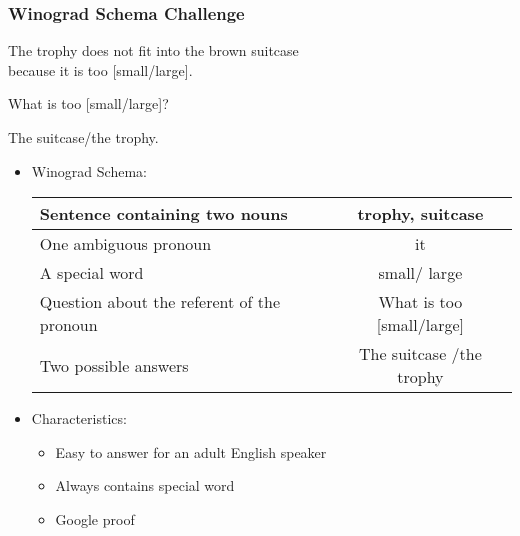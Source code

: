 \documentclass[c,8pt,xcolor...,x11names]{beamer}
\begin{document}
\begin{frame}
\frametitle{Winograd Schema Challenge}
	\begin{itemize}
	\small{
	\item[S:] The trophy does not fit into the brown suitcase\\ because \alert{it} is too \alert{[small/large]}.
	\item[Q:] What is too [small/large]?
	\item[A:] The suitcase/the trophy. }
\end{itemize} 
\begin{itemize}
	\item Winograd Schema: 
	\begin{center}
	\begin{tabular}{ l | c }
		Sentence containing two nouns &  \alert{trophy}, \alert{suitcase} \\
		\hline 
		One ambiguous pronoun & \alert{it} \\  
		\hline
		A special word & \alert{small}/\alert{ large}\\
		\hline
		Question about the referent of the pronoun & What is too [\alert{small}/\alert{large}]\\
		\hline
		Two possible answers & \alert{The suitcase} /\alert{the trophy}\\
	\end{tabular}
	\end{center}


		 \item Characteristics:
		  \begin{itemize}
		\normalsize
		\item Easy to answer for an adult English speaker
		\item Always contains \alert{special word}
		\item Google proof
	\end{itemize}
\end{itemize}
\end{frame}
\end{document}
